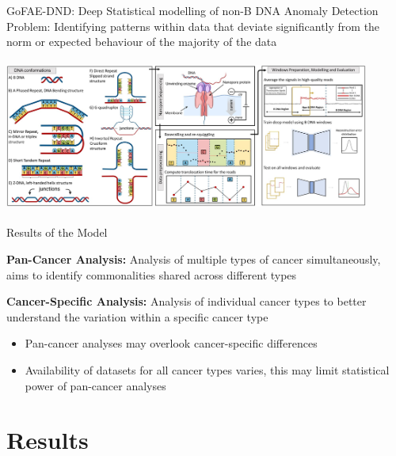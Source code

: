 \documentclass{beamer}
\begin{document}
	\begin{frame}{GoFAE-DND: Deep Statistical modelling of non-B DNA}
		Anomaly Detection Problem: Identifying patterns within data that deviate significantly from the norm or expected behaviour of the majority of the data
		\begin{center}
		\includegraphics[width=12cm, height=5cm]{gofae.jpeg}
		\end{center}
	\end{frame}

	\begin{frame}{Results of the Model}
		
		\textbf{\color{blue}Pan-Cancer Analysis:} Analysis of multiple types of cancer simultaneously, aims to identify commonalities shared across different types
		
		
		\textbf{\color{blue}Cancer-Specific Analysis:} Analysis of individual cancer types to better understand the variation within a specific cancer type \vspace{1cm}
		
		\begin{itemize}
			\item Pan-cancer analyses may overlook cancer-specific differences
			\item Availability of datasets for all cancer types varies, this may limit statistical power of pan-cancer analyses
		\end{itemize}
		
	\end{frame}

	\section{Results}
	
\end{document}
